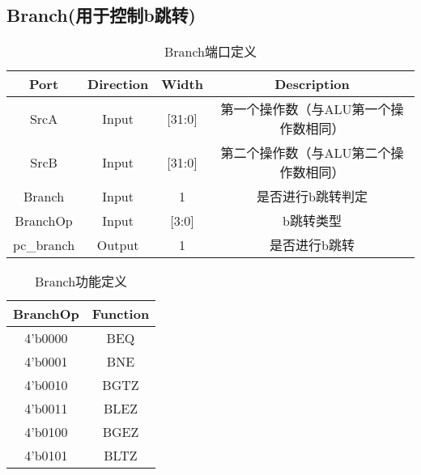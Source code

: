 \documentclass[UTF8]{ctexart}
\begin{document}
\subsection{Branch(用于控制b跳转)}
\begin{table}[H]
	\centering
	\begin{threeparttable}
		\caption{Branch端口定义}
		\begin{tabular}{cccc}
			\toprule
			\rowcolor{mypink}
			\textbf{Port} & \textbf{Direction} & \textbf{Width} & \textbf{Description}                  \\
			\midrule
			SrcA          & Input              & [31:0]         & 第一个操作数（与ALU第一个操作数相同） \\
			\midrule
			SrcB          & Input              & [31:0]         & 第二个操作数（与ALU第二个操作数相同） \\
			\midrule
			Branch        & Input              & 1              & 是否进行b跳转判定                     \\
			\midrule
			BranchOp      & Input              & [3:0]          & b跳转类型                             \\
			\midrule
			pc\_branch    & Output             & 1              & 是否进行b跳转                         \\
			\midrule
		\end{tabular}
	\end{threeparttable}
\end{table}
\begin{table}[H]
	\centering
	\begin{threeparttable}
		\caption{Branch功能定义}
		\begin{tabular}{cc}
			\toprule
			\rowcolor{mypink}
			\textbf{BranchOp} & \textbf{Function} \\
			\midrule
			4'b0000           & BEQ               \\
			\midrule
			4'b0001           & BNE               \\
			\midrule
			4'b0010           & BGTZ              \\
			\midrule
			4'b0011           & BLEZ              \\
			\midrule
			4'b0100           & BGEZ              \\
			\midrule
			4'b0101           & BLTZ              \\
			\midrule
		\end{tabular}
	\end{threeparttable}
\end{table}
\newpage
\end{document}
